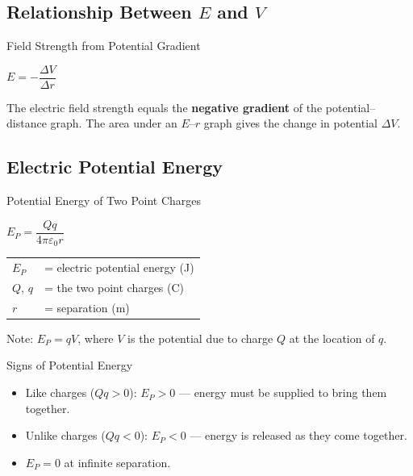 \subsection{Relationship Between $E$ and $V$}

\begin{formulabox}{Field Strength from Potential Gradient}
\begin{center}
\large $E = -\dfrac{\Delta V}{\Delta r}$
\end{center}
\vspace{0.2em}
The electric field strength equals the \textbf{negative gradient} of the potential–distance graph.
The area under an $E$–$r$ graph gives the change in potential $\Delta V$.
\end{formulabox}

\subsection{Electric Potential Energy}

\begin{formulabox}{Potential Energy of Two Point Charges}
\begin{center}
\Large $E_P = \dfrac{Qq}{4\pi\varepsilon_0 r}$
\end{center}
\vspace{0.3em}
\begin{tabular}{@{}ll@{}}
$E_P$ & = electric potential energy (J) \\
$Q,\,q$ & = the two point charges (C) \\
$r$ & = separation (m) \\
\end{tabular}
\vspace{0.3em}

Note: $E_P = qV$, where $V$ is the potential due to charge $Q$ at the location of $q$.
\end{formulabox}

\begin{keybox}{Signs of Potential Energy}
\begin{itemize}[itemsep=2pt]
  \item Like charges ($Qq > 0$): $E_P > 0$ — energy must be supplied to bring them together.
  \item Unlike charges ($Qq < 0$): $E_P < 0$ — energy is released as they come together.
  \item $E_P = 0$ at infinite separation.
\end{itemize}
\end{keybox}

